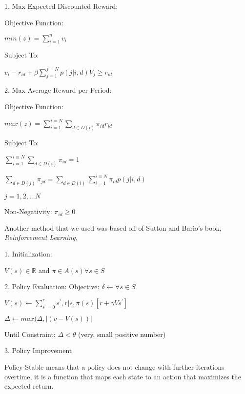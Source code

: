 \documentclass[conference]{IEEEtran}
\begin{document}
\vspace{3pt}

1. Max Expected Discounted Reward:

Objective Function: 

$min (z) = \sum_{i = 1}^{n} v_i$ 

Subject To: 

$v_{i} - r_{id} + \beta \sum_{j=1}^{j=N} p(j|i,d) V_{j} \ge r_{id}$

\vspace{3pt}

2. Max Average Reward per Period:

Objective Function: 

$max (z) = \sum_{i = 1}^{i = N} \sum_{d \in D(i)} \pi_{id} r_{id}$

Subject To: 

$\sum_{i = 1}^{i \equiv N} \sum_{d \in D(i)} \pi_{id} = 1$

$\sum_{d \in D(j)} \pi_{jd} = \sum_{d \in D(i)} \sum_{i = 1}^{i \equiv N} \pi_{id} p(j|i,d)$

\vspace{2pt}

$j = 1, 2, ... N$

Non-Negativity: $\pi_{id} \ge 0$


Another method that we used was based off of Sutton and Bario’s book, \it{Reinforcement Learning}, 

1. Initialization: 


$V(s) \in \mathbb{R}$ and $\pi \in A(s) \forall s \in S$

\vspace{3pt}

2. Policy Evaluation:
Objective: $\delta \leftarrow \forall s \in S$

$ V(s) \leftarrow \sum_{s^{'}=0}^{r} s^{'}, r| s, \pi(s) [r + \gamma V s^{'}]$

$ \Delta \leftarrow max(\Delta , |(v - V(s))|$

Until Constraint: $\Delta < \theta$ (very, small positive number)

\vspace{3pt}

3. Policy Improvement


Policy-Stable means that a policy does not change with further iterations overtime, it is a function that maps each state to an action that maximizes the expected return. 
\end{document}

